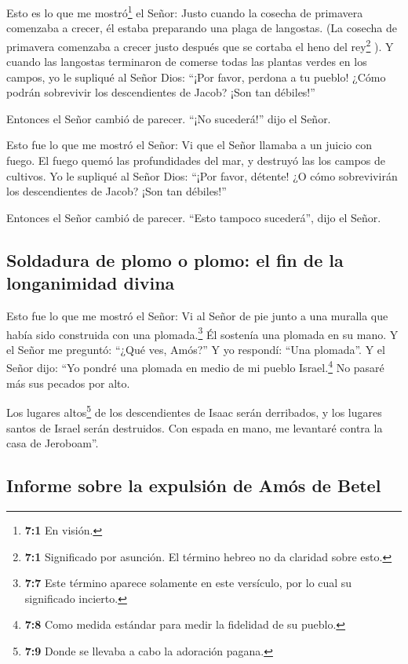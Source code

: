  Esto es lo que me mostró\footnote{\textbf{7:1} En visión.}
el Señor: Justo cuando la cosecha de primavera comenzaba a crecer, él
estaba preparando una plaga de langostas. (La cosecha de primavera
comenzaba a crecer justo después que se cortaba el heno del
rey\footnote{\textbf{7:1} Significado por asunción. El término hebreo no
  da claridad sobre esto.} ).  Y cuando las langostas
terminaron de comerse todas las plantas verdes en los campos, yo le
supliqué al Señor Dios: ``¡Por favor, perdona a tu pueblo! ¿Cómo podrán
sobrevivir los descendientes de Jacob? ¡Son tan débiles!''

 Entonces el Señor cambió de parecer. ``¡No sucederá!''
dijo el Señor.

 Esto fue lo que me mostró el Señor: Vi que el Señor
llamaba a un juicio con fuego. El fuego quemó las profundidades del mar,
y destruyó las los campos de cultivos.  Yo le supliqué al
Señor Dios: ``¡Por favor, détente! ¿O cómo sobrevivirán los
descendientes de Jacob? ¡Son tan débiles!''

 Entonces el Señor cambió de parecer. ``Esto tampoco
sucederá'', dijo el Señor.

\hypertarget{soldadura-de-plomo-o-plomo-el-fin-de-la-longanimidad-divina}{%
\subsection{Soldadura de plomo o plomo: el fin de la longanimidad
divina}\label{soldadura-de-plomo-o-plomo-el-fin-de-la-longanimidad-divina}}

 Esto fue lo que me mostró el Señor: Vi al Señor de pie
junto a una muralla que había sido construida con una
plomada.\footnote{\textbf{7:7} Este término aparece solamente en este
  versículo, por lo cual su significado incierto.} Él sostenía una
plomada en su mano.  Y el Señor me preguntó: ``¿Qué ves,
Amós?'' Y yo respondí: ``Una plomada''. Y el Señor dijo: ``Yo pondré una
plomada en medio de mi pueblo Israel.\footnote{\textbf{7:8} Como medida
  estándar para medir la fidelidad de su pueblo.} No pasaré más sus
pecados por alto.

 Los lugares altos\footnote{\textbf{7:9} Donde se llevaba
  a cabo la adoración pagana.} de los descendientes de Isaac serán
derribados, y los lugares santos de Israel serán destruidos. Con espada
en mano, me levantaré contra la casa de Jeroboam''.

\hypertarget{informe-sobre-la-expulsiuxf3n-de-amuxf3s-de-betel}{%
\subsection{Informe sobre la expulsión de Amós de
Betel}\label{informe-sobre-la-expulsiuxf3n-de-amuxf3s-de-betel}}

